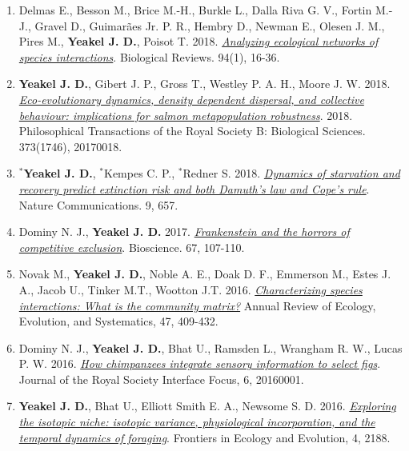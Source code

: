 \documentclass[margin,line,12pt]{res}
\begin{document}
\begin{resume}
\begin{enumerate}
\item Delmas E., Besson M., Brice M.-H., Burkle L., Dalla Riva G. V., Fortin M.-J., Gravel D., Guimar\~aes Jr. P. R., Hembry D., Newman E., Olesen J. M., Pires M., \textbf{Yeakel J. D.}, Poisot T. 2018. \href{https://onlinelibrary.wiley.com/doi/abs/10.1111/brv.12433}{\emph{Analyzing ecological networks of species interactions}}. Biological Reviews. 94(1), 16-36.

\item \textbf{Yeakel J. D.}, Gibert J. P., Gross T., Westley P. A. H., Moore J. W. 2018. \href{https://royalsocietypublishing.org/doi/10.1098/rstb.2017.0018}{\emph{Eco-evolutionary dynamics, density dependent dispersal, and collective behaviour: implications for salmon metapopulation robustness}}. 2018. Philosophical Transactions of the Royal Society B: Biological Sciences. 373(1746), 20170018.

\item \textbf{${}^\ast$Yeakel J. D.}, ${}^\ast$Kempes C. P., ${}^\ast$Redner S. 2018. \href{https://www.nature.com/articles/s41467-018-02822-y}{\emph{Dynamics of starvation and recovery predict extinction risk and both Damuth's law and Cope's rule}}. Nature Communications. 9, 657.

\item Dominy N. J., \textbf{Yeakel J. D.} 2017. \href{https://academic.oup.com/bioscience/article-pdf/67/2/107/10251235/biw133.pdf}{\emph{Frankenstein and the horrors of competitive exclusion}}. Bioscience. 67, 107-110.

\item Novak M., \textbf{Yeakel J. D.}, Noble A. E., Doak D. F., Emmerson M., Estes J. A., Jacob U., Tinker M.T., Wootton J.T. 2016. \href{https://pubs.er.usgs.gov/publication/70173930}{\emph{Characterizing species interactions: What is the community matrix?}} Annual Review of Ecology, Evolution, and Systematics, 47, 409-432.

\item Dominy N. J., \textbf{Yeakel J. D.}, Bhat U., Ramsden L., Wrangham R. W., Lucas P. W. 2016. \href{https://royalsocietypublishing.org/doi/full/10.1098/rsfs.2016.0001}{\emph{How chimpanzees integrate sensory information to select figs}}. Journal of the Royal Society Interface Focus, 6, 20160001.

\item \textbf{Yeakel J. D.}, Bhat U., Elliott Smith E. A., Newsome S. D. 2016. \href{https://www.frontiersin.org/articles/10.3389/fevo.2016.00001/full}{\emph{Exploring the isotopic niche: isotopic variance, physiological incorporation, and the temporal dynamics of foraging}}. Frontiers in Ecology and Evolution, 4, 2188.


\end{enumerate}
\end{resume}
\end{document}
